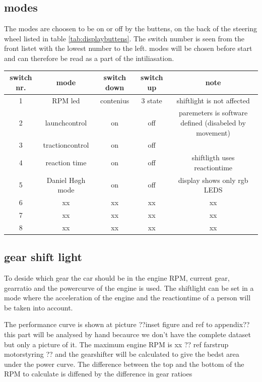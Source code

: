 \subsection*{modes}
The modes are choosen to be on or off by the buttens, on the back of the steering wheel listed in table \ref{tab:displaybuttens}. The switch number is seen from the front listet with the lowest number to the left.
modes will be chosen before start and can therefore be read as a part of the intiliasation.   
\begin{center}
\footnotesize
  \begin{tabular}{| c | c | c | c | c |}
    \hline
    switch nr. & mode      & switch down   & switch up & note  \\ \hline
    1 & RPM led         & contenius & 3 state       & shiftlight is not affected \\ \hline
    2 & launchcontrol   & on        & off           & paremeters is software defined (disabeled by movement) \\ \hline
    3 & tractioncontrol & on        & off           &   \\ \hline
    4 & reaction time   & on        & off           & shiftligth uses reactiontime \\ \hline
    5 & Daniel Høgh mode & on       & off           & display shows only rgb LEDS \\ \hline
    6 & xx & xx & xx & xx \\ \hline
    7 & xx & xx & xx & xx \\ \hline
    8 & xx & xx & xx & xx \\ \hline
  \end{tabular}
\label{tab:modes}
\end{center}

\subsection{gear shift light}
To deside which gear the car should be in the engine RPM, current gear, gearratio and the powercurve of the engine is used.
The shiftlight can be set in a mode where the acceleration of the engine and the reactiontime of a person will be taken into account.   

The performance curve is shown at picture ??inset figure and ref to appendix?? this part will be analysed by hand becaurce we don't have the complete dataset but only a picture of it.
The maximum engine RPM is xx ?? ref farstrup motorstyring ?? and the gearshifter will be calculated to give the bedst area under the power curve.
The difference between the top and the bottom of the RPM to calculate is diffened by the difference in gear ratioes 
    
